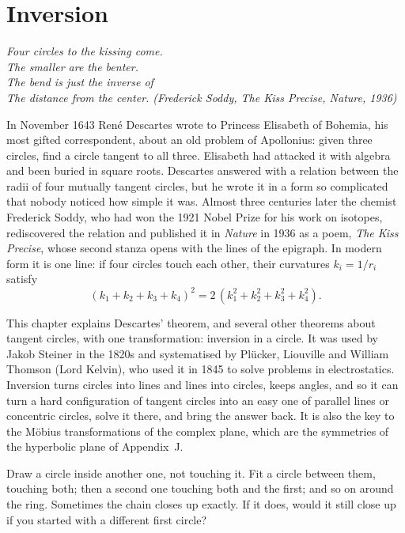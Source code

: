 \chapter{Inversion}\label{geometry:ch:inversion}

\begin{center}\itshape
Four circles to the kissing come.\\
The smaller are the benter.\\
The bend is just the inverse of\\
The distance from the center.
\upshape(Frederick Soddy, \emph{The Kiss Precise}, Nature, 1936)
\end{center}

In November 1643 Ren\'e Descartes wrote to Princess Elisabeth of Bohemia, his most gifted correspondent, about an old problem of
Apollonius: given three circles, find a circle tangent to all three. Elisabeth had attacked it with algebra and been buried in
square roots. Descartes answered with a relation between the radii of four mutually tangent circles, but he wrote it in a form so
complicated that nobody noticed how simple it was. Almost three centuries later the chemist Frederick Soddy, who had won the 1921 Nobel
Prize for his work on isotopes, rediscovered the relation and published it in \emph{Nature} in 1936 as a poem, \emph{The Kiss
Precise}, whose second stanza opens with the lines of the epigraph. In modern form it is one line: if four circles touch each other, their
curvatures $k_i=1/r_i$ satisfy
\[
(k_1+k_2+k_3+k_4)^2=2\,(k_1^2+k_2^2+k_3^2+k_4^2).
\]

This chapter explains Descartes' theorem, and several other theorems about tangent circles, with one transformation: inversion in a
circle. It was used by Jakob Steiner in the 1820s and systematised by Pl\"ucker, Liouville and William Thomson (Lord Kelvin), who used
it in 1845 to solve problems in electrostatics. Inversion turns circles into lines and lines into circles, keeps angles, and so it
can turn a hard configuration of tangent circles into an easy one of parallel lines or concentric circles, solve it there, and bring the
answer back. It is also the key to the M\"obius transformations of the complex plane, which are the symmetries of the hyperbolic plane of
Appendix~J.

\begin{think}
Draw a circle inside another one, not touching it. Fit a circle between them, touching both; then a second one touching both and the first;
and so on around the ring. Sometimes the chain closes up exactly. If it does, would it still close up if you started with a different first
circle?
\end{think}

